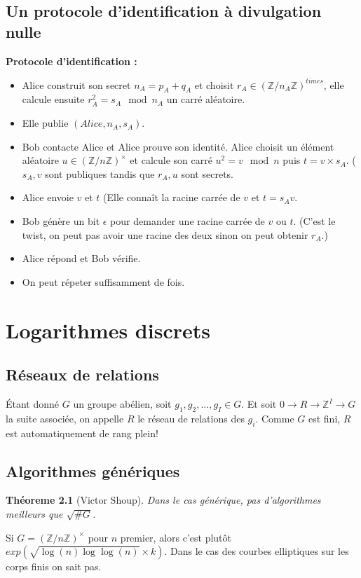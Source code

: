 \documentclass[a4paper,12pt]{book}
\newcommand{\Z}{\mathbb{Z}}
\theoremstyle{plain}
\newtheorem{thm}[subsection]{Théoreme}
\theoremstyle{definition}
\theoremstyle{remark}
\begin{document}
\section{Un protocole d'identification à divulgation nulle}
\textbf{Protocole d'identification :}
\begin{itemize}
    \item Alice construit son secret $n_A=p_A+q_A$ et choisit
        $r_A\in (\Z/n_A\Z)^{times}$, elle calcule ensuite 
        $r_A^2=s_A\mod n_A$ un carré aléatoire.
    \item Elle publie $(Alice,n_A,s_A)$.
    \item Bob contacte Alice et Alice prouve son identité. Alice
        choisit un élément aléatoire $u\in(\Z/n\Z)^{\times}$ et
        calcule son carré $u^2=v\mod n$ puis $t=v\times s_A$. (
        $s_A, v$ sont publiques tandis que $r_A,u$ sont secrets.
    \item Alice envoie $v$ et $t$ (Elle connaît la racine carrée
        de $v$ et $t=s_A v$.
    \item Bob génère un bit $\epsilon$ pour demander une racine
        carrée de $v$ ou $t$. (C'est le twist, on peut pas avoir une
        racine des deux sinon on peut obtenir $r_A$.)
    \item Alice répond et Bob vérifie.
    \item On peut répeter suffisamment de fois.
\end{itemize}

\chapter{Logarithmes discrets}
\section{Réseaux de relations}
Étant donné $G$ un groupe abélien, soit $g_1,g_2,\ldots, g_I\in G$.
Et soit $0\to R\to \Z^I\to G$ la suite associée, on appelle 
$R$ le réseau de relations des $g_i$. Comme $G$ est fini, $R$ est
automatiquement de rang plein!
\section{Algorithmes génériques}
\begin{thm}[Victor Shoup]
    Dans le cas générique, pas d'algorithmes meilleurs que 
    $\sqrt{\#G}$.
\end{thm}

Si $G=(\Z/n\Z)^{\times}$ pour $n$ premier, alors c'est plutôt
$exp(\sqrt{\log(n)\log\log(n)}\times k)$. Dans le cas des courbes
elliptiques sur les corps finis on sait pas.
\end{document}

